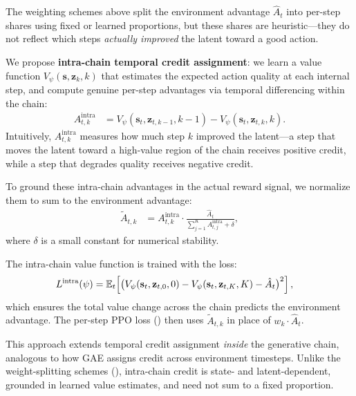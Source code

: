 The weighting schemes above split the environment advantage $\hat{A}_t$
into per-step shares using fixed or learned proportions, but these shares
are heuristic---they do not reflect which steps \emph{actually improved}
the latent toward a good action.

We propose \textbf{intra-chain temporal credit assignment}: we learn a
value function $V_\psi(\mathbf{s}, \mathbf{z}_k, k)$ that estimates the
expected action quality at each internal step, and compute genuine
per-step advantages via temporal differencing within the chain:
\begin{align}
  A_{t,k}^{\text{intra}}
    &= V_\psi(\mathbf{s}_t, \mathbf{z}_{t,k-1}, k{-}1)
     - V_\psi(\mathbf{s}_t, \mathbf{z}_{t,k}, k).
  \label{eq:intra_adv}
\end{align}
Intuitively, $A_{t,k}^{\text{intra}}$ measures how much step $k$
improved the latent---a step that moves the latent toward a
high-value region of the chain receives positive credit, while a step
that degrades quality receives negative credit.

To ground these intra-chain advantages in the actual reward signal, we
normalize them to sum to the environment advantage:
\begin{align}
  \tilde{A}_{t,k}
    &= A_{t,k}^{\text{intra}} \cdot
       \frac{\hat{A}_t}
            {\sum_{j=1}^{K} A_{t,j}^{\text{intra}} + \delta},
  \label{eq:intra_norm}
\end{align}
where $\delta$ is a small constant for numerical stability.

The intra-chain value function is trained with the loss:
\begin{align}
  L^{\text{intra}}(\psi)
    &= \mathbb{E}_t\!\left[\bigl(
         V_\psi(\mathbf{s}_t, \mathbf{z}_{t,0}, 0)
       - V_\psi(\mathbf{s}_t, \mathbf{z}_{t,K}, K)
       - \hat{A}_t
       \bigr)^2\right],
  \label{eq:intra_loss}
\end{align}
which ensures the total value change across the chain predicts the
environment advantage.  The per-step PPO loss ()
then uses $\tilde{A}_{t,k}$ in place of $w_k \cdot \hat{A}_t$.

This approach extends temporal credit assignment \emph{inside} the
generative chain, analogous to how GAE assigns credit across
environment timesteps.  Unlike the weight-splitting schemes
(), intra-chain credit is state- and
latent-dependent, grounded in learned value estimates, and need not
sum to a fixed proportion.

